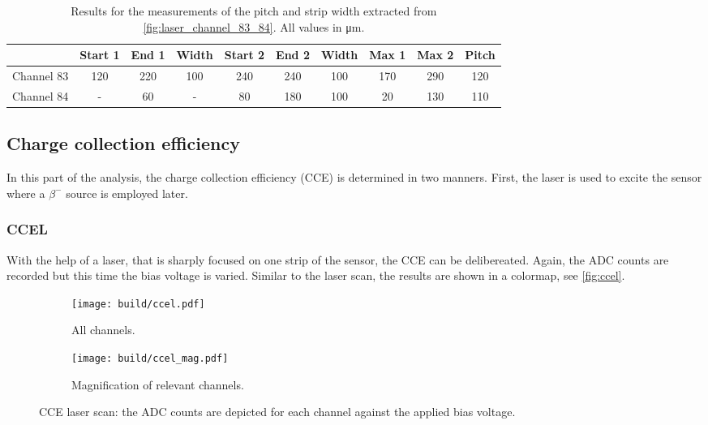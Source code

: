 \begin{table}
    \centering
    \caption{Results for the measurements of the pitch and strip width extracted from \autoref{fig:laser_channel_83_84}. All values in \unit{\micro\metre}.}
    \label{tab:pitch_width}
    \begin{tabular}{l | c c | c || c c | c || c c | c}
      \toprule
      {} & {Start 1} & {End 1} & {Width} & {Start 2} & {End 2} & {Width} & {Max 1} & {Max 2} & {Pitch} \\
      \midrule
      {Channel 83} & 120 & 220 & 100    & 240 & 240 & 100   & 170 & 290 & 120 \\ 
      {Channel 84} &  -  &  60 &  -     &  80 & 180 & 100   &  20 & 130 & 110 \\
      \bottomrule
    \end{tabular}
  \end{table}


\subsection{Charge collection efficiency}
In this part of the analysis, the charge collection efficiency (CCE) is determined in two manners. First, the laser is used to excite the sensor where a $\beta^-$ 
source is employed later.

\subsubsection{CCEL}
With the help of a laser, that is sharply focused on one strip of the sensor, the CCE can be delibereated. Again, the ADC counts are recorded but this time the
bias voltage is varied. Similar to the laser scan, the results are shown in a colormap, see \autoref{fig:ccel}.
\begin{figure}
    \centering
    \begin{subfigure}{0.49\textwidth}
        \texttt{[image: build/ccel.pdf]}
        \caption{All channels.}
        \label{fig:ccel_all_channels}
    \end{subfigure}
    \hfill
    \begin{subfigure}{0.49\textwidth}
        \texttt{[image: build/ccel\_mag.pdf]}
        \caption{Magnification of relevant channels.}
        \label{fig:ccel_mag}
    \end{subfigure}
    \caption{CCE laser scan: the ADC counts are depicted for each channel against the applied bias voltage.}
    \label{fig:ccel}
\end{figure}

